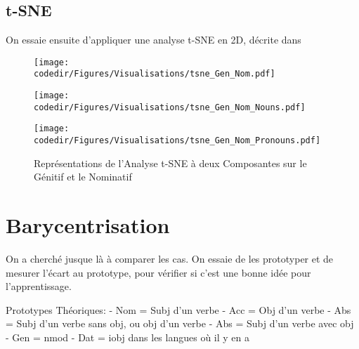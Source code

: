 \subsection{t-SNE}
On essaie ensuite d'appliquer une analyse t-SNE en 2D, décrite dans \cite{tSNE}
\begin{figure}[H]
    \begin{center}
        \begin{minipage}{.5\textwidth}
            \begin{center}
                \texttt{[image: \\codedir/Figures/Visualisations/tsne\_Gen\_Nom.pdf]}
            \end{center}
        \end{minipage}
    \end{center}

    \begin{minipage}{.5\textwidth}
        \begin{center}
            \texttt{[image: \\codedir/Figures/Visualisations/tsne\_Gen\_Nom\_Nouns.pdf]}
        \end{center}
    \end{minipage}
    \begin{minipage}{.5\textwidth}
        \begin{center}
            \texttt{[image: \\codedir/Figures/Visualisations/tsne\_Gen\_Nom\_Pronouns.pdf]}
        \end{center}
    \end{minipage}
    \caption{Représentations de l'Analyse t-SNE à deux Composantes sur le Génitif et le Nominatif}
\end{figure}



\newpage
\section{Barycentrisation}
On a cherché jusque là à comparer les cas. On essaie de les prototyper et de mesurer l'écart au prototype, pour vérifier si c'est une bonne idée pour l'apprentissage.

Prototypes Théoriques:
- Nom = Subj d'un verbe
- Acc = Obj d'un verbe
- Abs = Subj d'un verbe sans obj, ou obj d'un verbe
- Abs = Subj d'un verbe avec obj
- Gen = nmod
- Dat = iobj dans les langues où il y en a

\appendix




\appendix
\listoftables
\listoffigures


